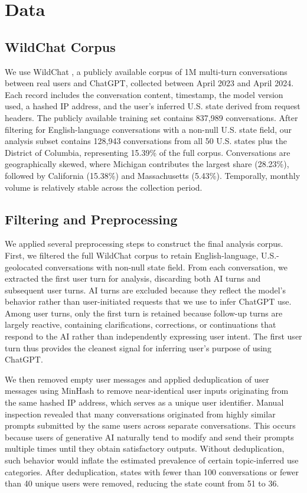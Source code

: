 \documentclass[11pt]{article}
\begin{document}
\section{Data}
\label{sec:data}

\subsection{WildChat Corpus}
We use WildChat \citep{zhao2024wildchat}, a publicly available corpus of 1M multi-turn conversations between real users and ChatGPT, collected between April 2023 and April 2024. Each record includes the conversation content, timestamp, the model version used, a hashed IP address, and the user's inferred U.S. state derived from request headers. The publicly available training set contains 837,989 conversations. After filtering for English-language conversations with a non-null U.S. state field, our analysis subset contains 128,943 conversations from all 50 U.S. states plus the District of Columbia, representing 15.39\% of the full corpus. Conversations are geographically skewed, where Michigan contributes the largest share (28.23\%), followed by California (15.38\%) and Massachusetts (5.43\%). Temporally, monthly volume is relatively stable across the collection period.

\subsection{Filtering and Preprocessing}
We applied several preprocessing steps to construct the final analysis corpus. First, we filtered the full WildChat corpus to retain English-language, U.S.-geolocated conversations with non-null state field. From each conversation, we extracted the first user turn for analysis, discarding both AI turns and subsequent user turns. AI turns are excluded because they reflect the model's behavior rather than user-initiated requests that we use to infer ChatGPT use. Among user turns, only the first turn is retained because follow-up turns are largely reactive, containing clarifications, corrections, or continuations that respond to the AI rather than independently expressing user intent. The first user turn thus provides the cleanest signal for inferring user's purpose of using ChatGPT. 

We then removed empty user messages and applied deduplication of user messages using MinHash to remove near-identical user inputs originating from the same hashed IP address, which serves as a unique user identifier. Manual inspection revealed that many conversations originated from highly similar prompts submitted by the same users across separate conversations. This occurs because users of generative AI naturally tend to modify and send their prompts multiple times until they obtain satisfactory outputs. Without deduplication, such behavior would inflate the estimated prevalence of certain topic-inferred use categories. After deduplication, states with fewer than 100 conversations or fewer than 40 unique users were removed, reducing the state count from 51 to 36.
\end{document}
